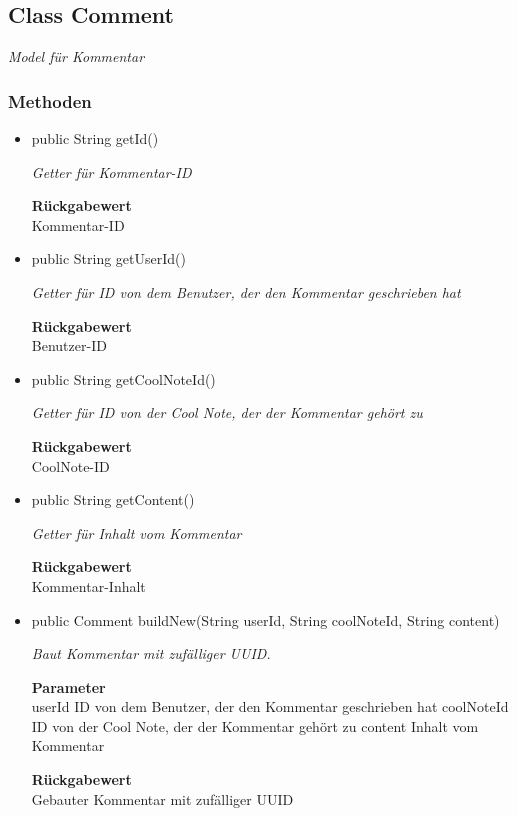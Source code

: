 \documentclass[a4paper]{scrreprt}
\begin{document}
    \subsection{Class Comment}
    \textit{Model für Kommentar}
    \subsubsection{Methoden}
    \begin{itemize}
    	\item{public String getId()}
    	
    	\textit{Getter für Kommentar-ID}
    	
    	
    	
    	\textbf{Rückgabewert} \\
    	Kommentar-ID        \item{public String getUserId()}
    	
    	\textit{Getter für ID von dem Benutzer, der den Kommentar geschrieben hat}
    	
    	
    	
    	\textbf{Rückgabewert} \\
    	Benutzer-ID        \item{public String getCoolNoteId()}
    	
    	\textit{Getter für ID von der Cool Note, der der Kommentar gehört zu}
    	
    	
    	
    	\textbf{Rückgabewert} \\
    	CoolNote-ID        \item{public String getContent()}
    	
    	\textit{Getter für Inhalt vom Kommentar}
    	
    	
    	
    	\textbf{Rückgabewert} \\
    	Kommentar-Inhalt        \item{public Comment buildNew(String userId, String coolNoteId, String content)}
    	
    	\textit{Baut Kommentar mit zufälliger UUID.}
    	
    	\textbf{Parameter} \\
    	userId ID von dem Benutzer, der den Kommentar geschrieben hat
    	coolNoteId ID von der Cool Note, der der Kommentar gehört zu
    	content Inhalt vom Kommentar
    	
    	\textbf{Rückgabewert} \\
    	Gebauter Kommentar mit zufälliger UUID
    \end{itemize}
\end{document}
